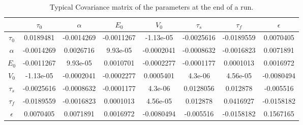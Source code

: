 \begin{table}[t]
\centering
\begin{tabular}{|c | c  c  c  c  c  c  c |}
\hline 
  & $\tau_0$ & $\alpha$ & $E_0$    & $V_0$    & $\tau_s$ & $\tau_f$ & $\epsilon$ \\
\hline 
\rowcolor[gray]{.8} $\tau_0$ &   0.0189481 & -0.0014269 & -0.0011267 & -1.13e-05 & -0.0025616 & -0.0189559 & 0.0070405 \\
$\alpha$ &                       -0.0014269 & 0.0026716 & 9.93e-05 & -0.0002041 & -0.0008632 & -0.0016823 & 0.0071891 \\
\rowcolor[gray]{.8} $E_0$    &   -0.0011267 & 9.93e-05 & 0.0010701 & -0.0002277 & -0.0001177 & 0.0001013 & 0.0016972 \\
$V_0$    &                       -1.13e-05 & -0.0002041 & -0.0002277 & 0.0005401 & 4.3e-06 & 4.56e-05 & -0.0080494 \\
\rowcolor[gray]{.8} $\tau_s$ &   -0.0025616 & -0.0008632 & -0.0001177 & 4.3e-06 & 0.0128056 & 0.012878 & -0.005516 \\
$\tau_f$ &                       -0.0189559 & -0.0016823 & 0.0001013 & 4.56e-05 & 0.012878 & 0.0416927 & -0.0158182 \\
\rowcolor[gray]{.8} $\epsilon$&  0.0070405 & 0.0071891 & 0.0016972 & -0.0080494 & -0.005516 & -0.0158182 & 0.1567165 \\
\hline 
\end{tabular}
\caption{Typical Covariance matrix of the parameters at the end of a run.}
\label{tab:CovSim} 
\end{table}

